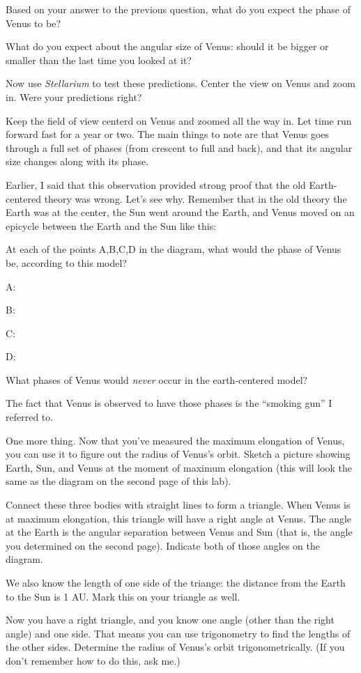 \vskip 0.7in

Based on your answer to the previous question, what do you expect the 
phase of Venus to be?

\vskip 0.7in

What do you expect about the angular size of Venus: should it be bigger
or smaller than the last time you looked at it?

\vskip 0.7in

Now use \textit{Stellarium} to
test these predictions.
Center the view on Venus and zoom in.
Were your predictions right?

\vskip 0.7in

Keep the field of view centerd on Venus and zoomed all the way in.  Let time
run forward fast for a year or two.  The main things to note are that
Venus goes through a full set of phases (from crescent to full and back),
and that its angular size changes along with its phase.

Earlier, I said that this observation provided strong proof that
the old Earth-centered theory was wrong.  Let's see why.  Remember that
in the old theory the Earth was at the center, the Sun went around the
Earth, and Venus moved on an epicycle between the Earth and the Sun like this:


\centerline{\epsfxsize 3in}


At each of the points A,B,C,D in the diagram, what would the phase
of Venus be, according to this model?

A:

B:

C: 

D:

What phases of Venus would {\it never} occur in the earth-centered
model?

\vskip 0.7in

The fact that Venus is observed to have those phases is the ``smoking
gun'' I referred to.

One more thing.  Now that you've measured the maximum elongation of
Venus, you can use it to figure out the radius of Venus's orbit.
Sketch a picture showing Earth, Sun, and Venus at the moment of 
maximum elongation (this will look the same as the diagram on the
second page of this lab).  

\vskip 2in

Connect these three bodies with straight lines to form a triangle.
When Venus is at maximum elongation, this triangle will have a right
angle at Venus.  The angle at the Earth is the angular separation
between Venus and Sun (that is, the angle you determined on the second page).
Indicate both of those angles on the diagram.

We also know the length of one side of the triange: the distance from
the Earth to the Sun is 1 AU.  Mark this on your triangle as well.

Now you have a right triangle, and you know one angle (other
than the right angle) and one side.
That means you can use trigonometry to find the lengths of the
other sides.  Determine the radius of Venus's orbit trigonometrically.
(If you don't remember how to do this, ask me.)



